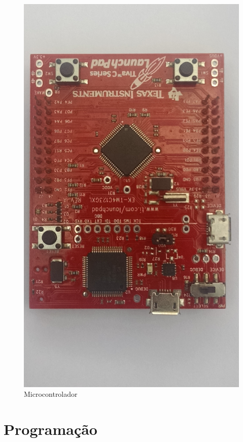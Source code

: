 \begin{figure}[!htb]
\center\includegraphics[scale=0.1, angle=180, clip=true, trim=0 750 60 500]{./imagens/uC-ARM.jpg}
\caption{Microcontrolador}
\label{fig:uCarm}
\end{figure}


\section{Programação}

